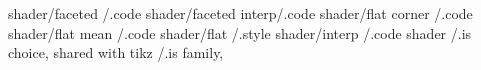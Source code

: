 shader/faceted       /.code                                               
shader/faceted interp/.code                                        
shader/flat corner   /.code                                           
shader/flat mean     /.code                                             
shader/flat          /.style                                                 
shader/interp        /.code                                                
shader               /.is choice,
shared with tikz     /.is family,

